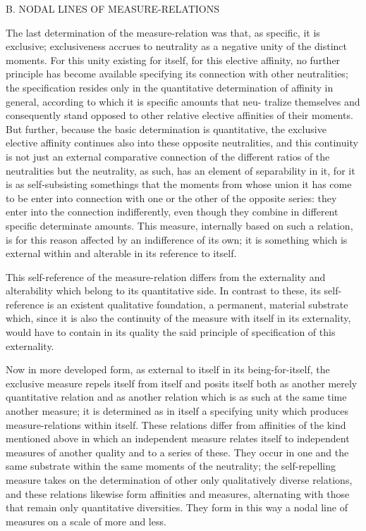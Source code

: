 B. NODAL LINES OF MEASURE-RELATIONS

The last determination of the measure-relation was
that, as specific, it is exclusive;
exclusiveness accrues to neutrality
as a negative unity of the distinct moments.
For this unity existing for itself,
for this elective affinity,
no further principle has become available
specifying its connection with other neutralities;
the specification resides only in
the quantitative determination of affinity in general,
according to which it is specific amounts that neu-
tralize themselves
and consequently stand opposed to other relative elective
affinities of their moments.
But further, because the basic determination is quantitative,
the exclusive elective affinity continues also into these opposite
neutralities,
and this continuity is not just
an external comparative connection of the different ratios
of the neutralities but the neutrality,
as such, has an element of separability in it,
for it is as self-subsisting somethings
that the moments from whose union
it has come to be enter into connection
with one or the other of the opposite series:
they enter into the connection indifferently,
even though they combine in different specific determinate amounts.
This measure, internally based on such a relation,
is for this reason affected by an indifference of its own;
it is something which is external within
and alterable in its reference to itself.

This self-reference of the measure-relation differs
from the externality and alterability
which belong to its quantitative side.
In contrast to these, its self-reference is
an existent qualitative foundation,
a permanent, material substrate
which, since it is also the continuity of
the measure with itself in its externality,
would have to contain in its quality the said
principle of specification of this externality.

Now in more developed form, as external
to itself in its being-for-itself,
the exclusive measure repels itself from itself
and posits itself both as another merely quantitative relation
and as another relation which is as such
at the same time another measure;
it is determined as in itself a specifying unity
which produces measure-relations within itself.
These relations differ from affinities of
the kind mentioned above in which
an independent measure relates itself
to independent measures of another quality
and to a series of these.
They occur in one and the same substrate
within the same moments of the neutrality;
the self-repelling measure takes on the determination
of other only qualitatively diverse relations,
and these relations likewise form affinities and measures,
alternating with those that remain only quantitative diversities.
They form in this way a nodal line of measures
on a scale of more and less.

